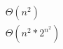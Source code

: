 \documentclass[14pt]{extarticle}
\begin{document}
\begin{gather}
\Theta(n^2) \\
\Theta(n^2 * 2^{n^2})
\end{gather}
\end{document}
